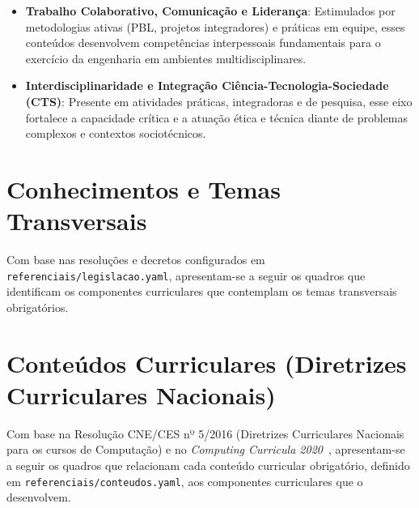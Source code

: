 \begin{itemize}
\item \textbf{Trabalho Colaborativo, Comunicação e Liderança}: Estimulados por metodologias ativas (PBL, projetos integradores) e práticas em equipe, esses conteúdos desenvolvem competências interpessoais fundamentais para o exercício da engenharia em ambientes multidisciplinares.

\item \textbf{Interdisciplinaridade e Integração Ciência-Tecnologia-Sociedade (CTS)}: Presente em atividades práticas, integradoras e de pesquisa, esse eixo fortalece a capacidade crítica e a atuação ética e técnica diante de problemas complexos e contextos sociotécnicos.

\end{itemize}

\section{Conhecimentos e Temas Transversais}

Com base nas resoluções e decretos configurados em \texttt{referenciais/legislacao.yaml}, apresentam-se a seguir os quadros que identificam os componentes curriculares que contemplam os temas transversais obrigatórios.


\section{Conteúdos Curriculares (Diretrizes Curriculares Nacionais)}

Com base na Resolução CNE/CES nº 5/2016 (Diretrizes Curriculares Nacionais para os cursos de Computação) e no \textit{Computing Curricula 2020}~\cite{ACM:CC2020}, apresentam-se a seguir os quadros que relacionam cada conteúdo curricular obrigatório, definido em \texttt{referenciais/conteudos.yaml}, aos componentes curriculares que o desenvolvem.

